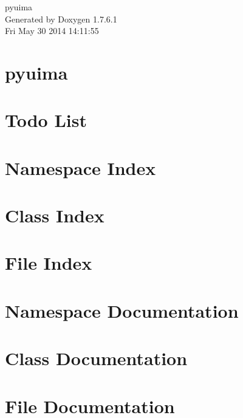 \documentclass[a4paper]{book}
\begin{document}
\hypersetup{pageanchor=false,citecolor=blue}
\begin{titlepage}
\vspace*{7cm}
\begin{center}
{\Large pyuima }\\
\vspace*{1cm}
{\large \-Generated by Doxygen 1.7.6.1}\\
\vspace*{0.5cm}
{\small Fri May 30 2014 14:11:55}\\
\end{center}
\end{titlepage}
\clearemptydoublepage
{}
\tableofcontents
\clearemptydoublepage
{}
\hypersetup{pageanchor=true,citecolor=blue}
\chapter{pyuima}
\label{index}\hypertarget{index}{}
\chapter{\-Todo \-List}
\label{todo}
\hypertarget{todo}{}

\chapter{\-Namespace \-Index}

\chapter{\-Class \-Index}

\chapter{\-File \-Index}

\chapter{\-Namespace \-Documentation}







\chapter{\-Class \-Documentation}




\chapter{\-File \-Documentation}






\printindex
\end{document}
